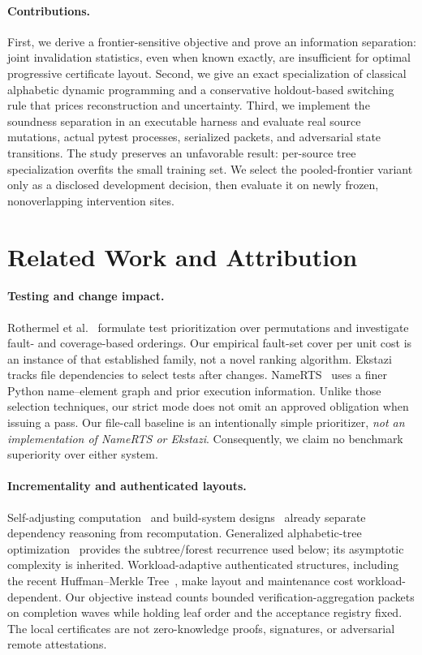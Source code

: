 \documentclass[11pt]{article}
\theoremstyle{definition}\newtheorem{definition}[theorem]{Definition}
\theoremstyle{remark}\newtheorem{remark}[theorem]{Remark}
\begin{document}
\paragraph{Contributions.}
First, we derive a frontier-sensitive objective and prove an information separation: joint invalidation statistics, even when known exactly, are insufficient for optimal progressive certificate layout. Second, we give an exact specialization of classical alphabetic dynamic programming and a conservative holdout-based switching rule that prices reconstruction and uncertainty. Third, we implement the soundness separation in an executable harness and evaluate real source mutations, actual pytest processes, serialized packets, and adversarial state transitions. The study preserves an unfavorable result: per-source tree specialization overfits the small training set. We select the pooled-frontier variant only as a disclosed development decision, then evaluate it on newly frozen, nonoverlapping intervention sites.

\section{Related Work and Attribution}
\paragraph{Testing and change impact.}
Rothermel et al.~\cite{rothermel} formulate test prioritization over permutations and investigate fault- and coverage-based orderings. Our empirical fault-set cover per unit cost is an instance of that established family, not a novel ranking algorithm. Ekstazi~\cite{ekstazi} tracks file dependencies to select tests after changes. NameRTS~\cite{namerts} uses a finer Python name--element graph and prior execution information. Unlike those selection techniques, our strict mode does not omit an approved obligation when issuing a pass. Our file-call baseline is an intentionally simple prioritizer, \emph{not an implementation of NameRTS or Ekstazi}. Consequently, we claim no benchmark superiority over either system.

\paragraph{Incrementality and authenticated layouts.}
Self-adjusting computation~\cite{acar} and build-system designs~\cite{build} already separate dependency reasoning from recomputation. Generalized alphabetic-tree optimization~\cite{alphabetic} provides the subtree/forest recurrence used below; its asymptotic complexity is inherited. Workload-adaptive authenticated structures, including the recent Huffman--Merkle Tree~\cite{hmt}, make layout and maintenance cost workload-dependent. Our objective instead counts bounded verification-aggregation packets on completion waves while holding leaf order and the acceptance registry fixed. The local certificates are not zero-knowledge proofs, signatures, or adversarial remote attestations.
\end{document}
